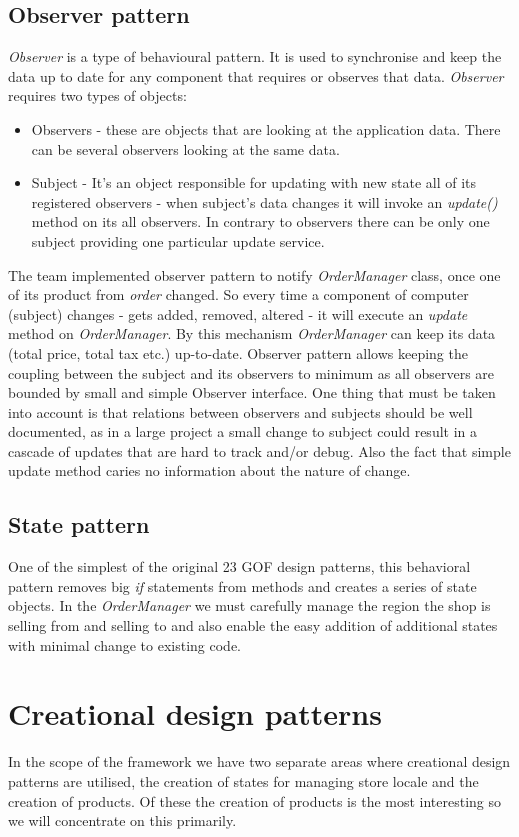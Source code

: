 \documentclass[pdftex,11pt,a4paper]{article}
\begin{document}
\subsection{Observer pattern}
\emph{Observer} is a type of behavioural pattern. It is used to synchronise and keep the data up to date for any component that requires or observes that data. \emph{Observer} requires two types of objects:
\begin{itemize}
	\item Observers - these are objects that are looking at the application data. There can be several observers looking at the same data.
	\item Subject - It's an object responsible for updating with new state all of its registered observers - when subject's data changes it will invoke an \emph{update()} method on its all observers. In contrary to observers there can be only one subject providing one particular update service.
\end{itemize}
The team implemented observer pattern to notify \emph{OrderManager} class, once one of its product from \emph{order} changed. So every time a component of computer (subject) changes - gets added, removed, altered - it will execute an \emph{update} method on \emph{OrderManager}. By this mechanism \emph{OrderManager} can keep its data (total price, total tax etc.) up-to-date.
Observer pattern allows keeping the coupling between the subject and its observers to minimum as all observers are bounded by small and simple Observer interface. One thing that must be taken into account is that relations between observers and subjects should be well documented, as in a large project a small change to subject could result in a cascade of updates that are hard to track and/or debug. Also the fact that simple update method caries no information about the nature of change.

\subsection{State pattern}
One of the simplest of the original 23 GOF design patterns, this behavioral pattern removes big \emph{if} statements from methods and creates a series of state objects. In the \emph{OrderManager} we must carefully manage the region the shop is selling from and selling to and also enable the easy addition of additional states with minimal change to existing code.
\pagebreak

\section{Creational design patterns}
In the scope of the framework we have two separate areas where creational design patterns are utilised, the creation of states for managing store locale and the creation of products. Of these the creation of products is the most interesting so we will concentrate on this primarily.
\end{document}
